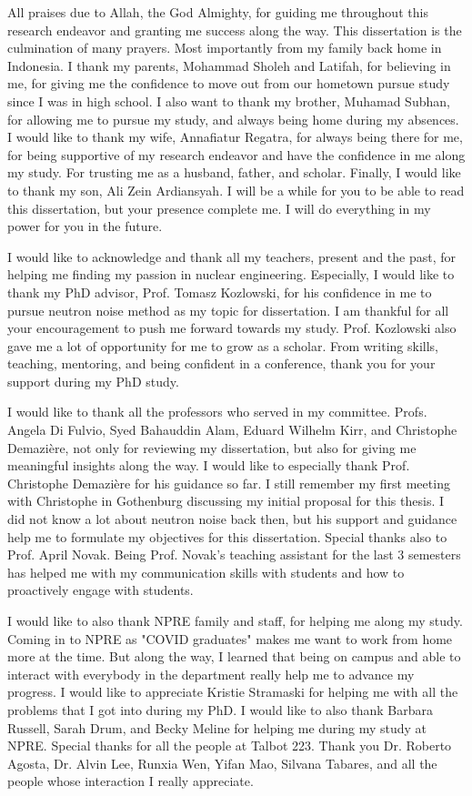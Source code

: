 \documentclass{uiucthesis2021}
\begin{document}
\begin{acknowledgments}

All praises due to Allah, the God Almighty, for guiding me throughout this research endeavor and granting me success along the way. This dissertation is the culmination of many prayers. Most importantly from my family back home in Indonesia. I thank my parents, Mohammad Sholeh and Latifah, for believing in me, for giving me the confidence to move out from our hometown pursue study since I was in high school. I also want to thank my brother, Muhamad Subhan, for allowing me to pursue my study, and always being home during my absences. I would like to thank my wife, Annafiatur Regatra, for always being there for me, for being supportive of my research endeavor and have the confidence in me along my study. For trusting me as a husband, father, and scholar. Finally, I would like to thank my son, Ali Zein Ardiansyah. I will be a while for you to be able to read this dissertation, but your presence complete me. I will do everything in my power for you in the future.

I would like to acknowledge and thank all my teachers, present and the past, for helping me finding my passion in nuclear engineering. Especially, I would like to thank my PhD advisor, Prof. Tomasz Kozlowski, for his confidence in me to pursue neutron noise method as my topic for dissertation. I am thankful for all your encouragement to push me forward towards my study. Prof. Kozlowski also gave me a lot of opportunity for me to grow as a scholar. From writing skills, teaching, mentoring, and being confident in a conference, thank you for your support during my PhD study.

I would like to thank all the professors who served in my committee. Profs. Angela Di Fulvio, Syed Bahauddin Alam, Eduard Wilhelm Kirr, and Christophe Demazière, not only for reviewing my dissertation, but also for giving me meaningful insights along the way. I would like to especially thank Prof. Christophe Demazière for his guidance so far. I still remember my first meeting with Christophe in Gothenburg discussing my initial proposal for this thesis. I did not know a lot about neutron noise back then, but his support and guidance help me to formulate my objectives for this dissertation. Special thanks also to Prof. April Novak. Being Prof. Novak's teaching assistant for the last 3 semesters has helped me with my communication skills with students and how to proactively engage with students.

I would like to also thank NPRE family and staff, for helping me along my study. Coming in to NPRE as "COVID graduates" makes me want to work from home more at the time. But along the way, I learned that being on campus and able to interact with everybody in the department really help me to advance my progress. I would like to appreciate Kristie Stramaski for helping me with all the problems that I got into during my PhD. I would like to also thank Barbara Russell, Sarah Drum, and Becky Meline for helping me during my study at NPRE. Special thanks for all the people at Talbot 223. Thank you Dr. Roberto Agosta, Dr. Alvin Lee, Runxia Wen, Yifan Mao, Silvana Tabares, and all the people whose interaction I really appreciate.


\end{acknowledgments}
\end{document}
